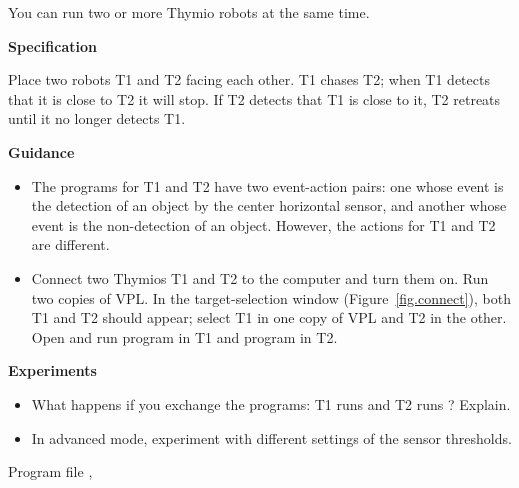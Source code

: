 \label{ch.two}

You can run two or more Thymio robots at the same time.

\textbf{Specification}

Place two robots T1 and T2 facing each other. T1 chases T2; when
T1 detects that it is close to T2 it will stop. If T2 detects that T1 is
close to it, T2 retreats until it no longer detects T1. 

\textbf{Guidance}

\begin{itemize}

\item The programs for T1 and T2 have two event-action pairs: one whose
event is the detection of an object by the center horizontal sensor, and
another whose event is the non-detection of an object. However, the
actions for T1 and T2 are different.

\item Connect two Thymios T1 and T2 to the computer and turn them on.
Run two copies of VPL. In the target-selection window
(Figure~\ref{fig.connect}), both T1 and T2 should appear; select T1 in
one copy of VPL and T2 in the other. Open and run program  in
T1 and program  in T2.
 
\end{itemize}

\textbf{Experiments}

\begin{itemize}

\item What happens if you exchange the programs: T1 runs
 and T2 runs ? Explain.

\item In advanced mode, experiment with different settings of the sensor
thresholds.

\end{itemize}


{\raggedleft \hfill Program file , }

\bigskip

